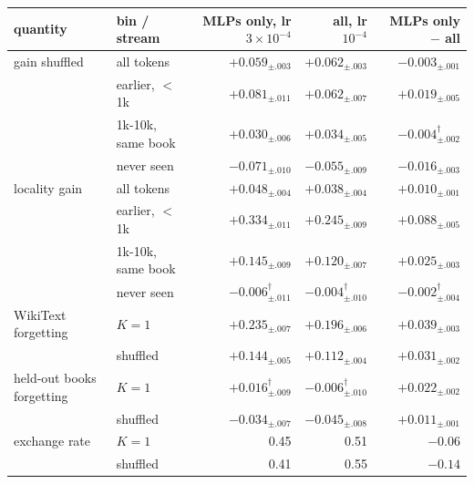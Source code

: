 \begin{tabular}{llrrr}
\toprule
quantity & bin / stream & MLPs only, lr $3\!\times\!10^{-4}$ & all, lr $10^{-4}$ & MLPs only $-$ all \\
\midrule
gain shuffled & all tokens & $+0.059_{\pm .003}$ & $+0.062_{\pm .003}$ & $-0.003_{\pm .001}$ \\
 & earlier, $<$ 1k & $+0.081_{\pm .011}$ & $+0.062_{\pm .007}$ & $+0.019_{\pm .005}$ \\
 & 1k-10k, same book & $+0.030_{\pm .006}$ & $+0.034_{\pm .005}$ & $-0.004_{\pm .002}^{\dagger}$ \\
 & never seen & $-0.071_{\pm .010}$ & $-0.055_{\pm .009}$ & $-0.016_{\pm .003}$ \\
locality gain & all tokens & $+0.048_{\pm .004}$ & $+0.038_{\pm .004}$ & $+0.010_{\pm .001}$ \\
 & earlier, $<$ 1k & $+0.334_{\pm .011}$ & $+0.245_{\pm .009}$ & $+0.088_{\pm .005}$ \\
 & 1k-10k, same book & $+0.145_{\pm .009}$ & $+0.120_{\pm .007}$ & $+0.025_{\pm .003}$ \\
 & never seen & $-0.006_{\pm .011}^{\dagger}$ & $-0.004_{\pm .010}^{\dagger}$ & $-0.002_{\pm .004}^{\dagger}$ \\
WikiText forgetting & $K=1$ & $+0.235_{\pm .007}$ & $+0.196_{\pm .006}$ & $+0.039_{\pm .003}$ \\
 & shuffled & $+0.144_{\pm .005}$ & $+0.112_{\pm .004}$ & $+0.031_{\pm .002}$ \\
held-out books forgetting & $K=1$ & $+0.016_{\pm .009}^{\dagger}$ & $-0.006_{\pm .010}^{\dagger}$ & $+0.022_{\pm .002}$ \\
 & shuffled & $-0.034_{\pm .007}$ & $-0.045_{\pm .008}$ & $+0.011_{\pm .001}$ \\
exchange rate & $K=1$ & 0.45 & 0.51 & $-0.06$ \\
 & shuffled & 0.41 & 0.55 & $-0.14$ \\
\bottomrule
\end{tabular}
